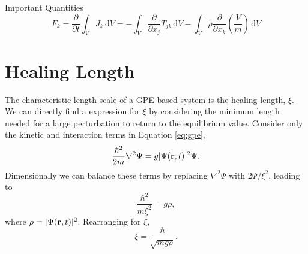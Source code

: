 \begin{chapter}{Important Quantities\label{app:ImpQuantities}}
\begin{equation}
F_k =\frac{\partial}{\partial t} \int_V J_k\,\mathrm{d}V = - \int_V \frac{\partial}{\partial x_j} T_{jk}\,\mathrm{d}V - \int_V \rho \frac{\partial}{\partial x_k} \left( \frac{V}{m} \right)\,\mathrm{d}V
\label{eq:force}
\end{equation}


\section{\label{section:healing} Healing Length}
The characteristic length scale of a GPE based system is the healing length, $\xi$. We can directly find a expression for $\xi$ by considering the minimum length needed for a large perturbation to return to the equilibrium value. Consider only the kinetic and interaction terms in Equation \ref{eq:gpe},
\begin{equation}
  \frac{\hbar^2}{2m}\nabla^2\Psi = g|\Psi({\bf r},t)|^2\Psi.
\end{equation}
Dimensionally we can balance these terms by replacing $\nabla^2\Psi$ with $2\Psi/\xi^2$, leading to
\begin{equation}
  \frac{\hbar^2}{m\xi^2} = g\rho,
\end{equation}
where $\rho = |\Psi({\bf r},t)|^2$. Rearranging for $\xi$,
\begin{equation}
  \xi = \frac{\hbar}{\sqrt{mg\rho}}.
\end{equation}
\end{chapter}

